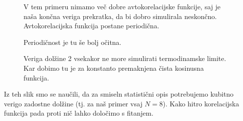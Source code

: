 \documentclass[a4 paper, 12pt]{article}
\begin{document}
\begin{figure}[H]
   \begin{center}
      
   \end{center}
   \vspace{-20pt}
   \caption{V tem primeru nimamo več dobre avtokorelacijske funkcije, saj
	je naša končna veriga prekratka, da bi dobro simulirala neskončno.
	Avtokorelacijska funkcija postane periodična.}
   \label{fig:pic}
   \vspace{-10pt}
\end{figure}

\begin{figure}[H]
   \begin{center}
      
   \end{center}
   \vspace{-20pt}
   \caption{Periodičnost je tu še bolj očitna.}
   \label{fig:pic}
   \vspace{-10pt}
\end{figure}

\begin{figure}[H]
   \begin{center}
      
   \end{center}
   \vspace{-20pt}
   \caption{Veriga dolžine 2 vsekakor ne more simulirati termodinamske limite. Kar dobimo
	tu je za konstanto premaknjena čista kosinusna funkcija.}
   \label{fig:pic}
   \vspace{-10pt}
\end{figure}

Iz teh slik smo se naučili, da za smiseln statistični opis potrebujemo kubitno
verigo zadostne dolžine (tj. za naš primer vsaj $N = 8$). Kako
hitro korelacijska funkcija pada proti nič lahko določimo s fitanjem.
\end{document}
